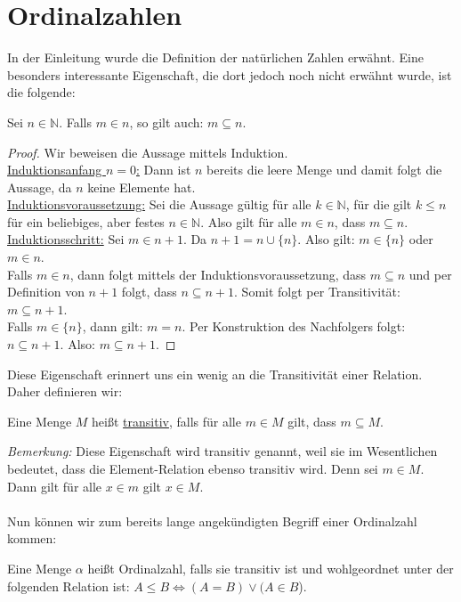 \documentclass[11pt]{scrartcl}
\newcommand{\N}{\mathbb{N}}
\begin{document}
\section{Ordinalzahlen}
In der Einleitung wurde die Definition der natürlichen Zahlen erwähnt. Eine besonders interessante Eigenschaft, die dort jedoch noch nicht erwähnt wurde, ist die folgende: 
\begin{lemma}
	Sei $n\in\N$. Falls $m\in n$, so gilt auch: $m \subseteq n$.
\end{lemma}
\begin{proof}
Wir beweisen die Aussage mittels Induktion. \\
\underline{Induktionsanfang $n=0$:} Dann ist $n$ bereits die leere Menge und damit folgt die Aussage, da $n$ keine Elemente hat. \\
\underline{Induktionsvoraussetzung:} Sei die Aussage gültig für alle $k\in\N$, für die gilt $k\leq n$ für ein beliebiges, aber festes $n\in\N$. Also gilt für alle $m \in n$, dass $m \subseteq n$. \\
\underline{Induktionsschritt:} Sei $m\in n+1$. Da $n+1= n \cup \{ n \}$. Also gilt: $m\in \{ n\}$ oder $m\in n$.\\ Falls $m\in n$, dann folgt mittels der Induktionsvoraussetzung, dass $m \subseteq n$ und per Definition von $n+1$ folgt, dass $n \subseteq n+1$. Somit folgt per Transitivität: $m \subseteq n+1$. \\
Falls $m\in \{ n\}$, dann gilt: $m=n$. Per Konstruktion des Nachfolgers folgt: $ n \subseteq n+1$. Also: $m \subseteq n+1$.
\end{proof}
Diese Eigenschaft erinnert uns ein wenig an die Transitivität einer Relation. Daher definieren wir:
\begin{definition}
	Eine Menge $M$ heißt \underline{transitiv}, falls für alle $m\in M$ gilt, dass $m\subseteq M$.
\end{definition}
\noindent\textit{Bemerkung:} Diese Eigenschaft wird transitiv genannt, weil sie im Wesentlichen bedeutet, dass die Element-Relation ebenso transitiv wird. Denn sei $m\in M$. Dann gilt für alle $x\in m$ gilt $x\in M$.\\\phantom{Test}\\ Nun können wir zum bereits lange angekündigten Begriff einer Ordinalzahl kommen:
\begin{definition}
	Eine Menge $\alpha$ heißt Ordinalzahl, falls sie transitiv ist und wohlgeordnet unter der folgenden Relation ist: $A \leq B \iff (A = B) \lor (A \in B$).
\end{definition}
\end{document}
